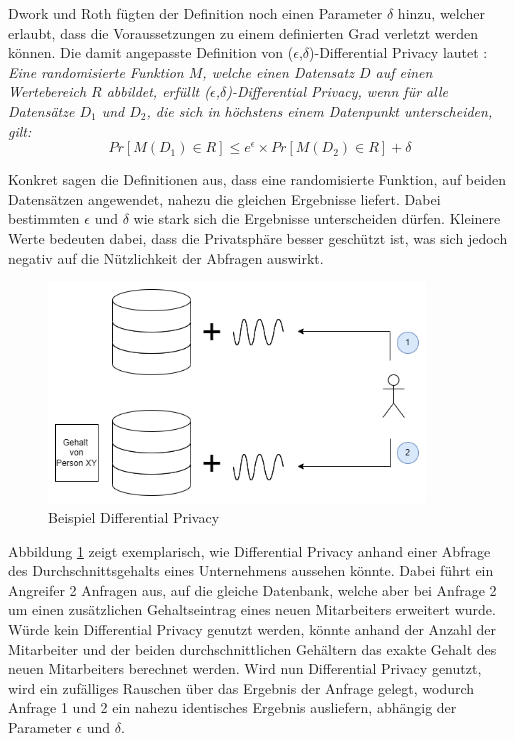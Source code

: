 Dwork und Roth \cite{P-27} fügten der Definition noch einen Parameter $\delta$ hinzu, welcher erlaubt, dass die Voraussetzungen zu einem definierten Grad verletzt werden können.
Die damit angepasste Definition von ($\epsilon$,$\delta$)-Differential Privacy lautet \cite{P-27}:\\
\textit{
    Eine randomisierte Funktion $M$, welche einen Datensatz $D$ auf einen Wertebereich $R$ abbildet, erfüllt ($\epsilon$,$\delta$)-Differential Privacy, wenn für alle Datensätze $D_{1}$ und $D_{2}$, die sich in höchstens einem Datenpunkt unterscheiden, gilt:}
\begin{equation}
    Pr[M(D_{1}) \in R] \leq e^{\epsilon} \times Pr[M(D_{2}) \in R] + \delta
\end{equation} 

Konkret sagen die Definitionen aus, dass eine randomisierte Funktion, auf beiden Datensätzen angewendet, nahezu die gleichen Ergebnisse liefert. 
Dabei bestimmten $\epsilon$ und $\delta$ wie stark sich die Ergebnisse unterscheiden dürfen. 
Kleinere Werte bedeuten dabei, dass die Privatsphäre besser geschützt ist, was sich jedoch negativ auf die Nützlichkeit der Abfragen auswirkt.

\begin{figure}[!htb]
    \centering
    \includegraphics[width=10cm]{figures/dp}
    \caption{Beispiel Differential Privacy}
    \label{fig:dp}
\end{figure} 

Abbildung \ref{fig:dp} zeigt exemplarisch, wie Differential Privacy anhand einer Abfrage des Durchschnittsgehalts eines Unternehmens aussehen könnte.
Dabei führt ein Angreifer 2 Anfragen aus, auf die gleiche Datenbank, welche aber bei Anfrage 2 um einen zusätzlichen Gehaltseintrag eines neuen Mitarbeiters erweitert wurde.
Würde kein Differential Privacy genutzt werden, könnte anhand der Anzahl der Mitarbeiter und der beiden durchschnittlichen Gehältern das exakte Gehalt des neuen Mitarbeiters berechnet werden.
Wird nun Differential Privacy genutzt, wird ein zufälliges Rauschen über das Ergebnis der Anfrage gelegt, wodurch Anfrage 1 und 2 ein nahezu identisches Ergebnis ausliefern, abhängig der Parameter $\epsilon$ und $\delta$.

